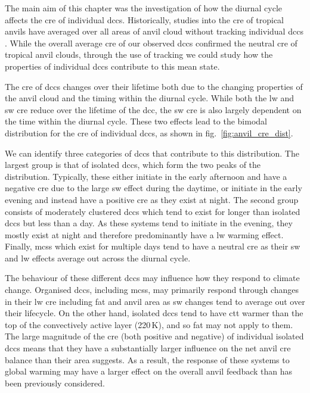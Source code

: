 The main aim of this chapter was the investigation of how the diurnal cycle affects the \acrshort{cre} of individual \acrshort{dcc}s.
Historically, studies into the \acrshort{cre} of tropical anvils have averaged over all areas of anvil cloud without tracking individual \acrshort{dcc}s \citep{ramanathan_cloud-radiative_1989, hartmann_effect_1992, stephens_cloudsat_2018}.
While the overall average \acrshort{cre} of our observed \acrshort{dcc}s confirmed the neutral \acrshort{cre} of tropical anvil clouds, through the use of tracking we could study how the properties of individual \acrshort{dcc}s contribute to this mean state.

The \acrshort{cre} of \acrshort{dcc}s changes over their lifetime both due to the changing properties of the anvil cloud and the timing within the diurnal cycle.
While both the \acrshort{lw} and \acrshort{sw} \acrshort{cre} reduce over the lifetime of the \acrshort{dcc}, the \acrshort{sw} \acrshort{cre} is also largely dependent on the time within the diurnal cycle.
These two effects lead to the bimodal distribution for the \acrshort{cre} of individual \acrshort{dcc}s, as shown in fig.~\ref{fig:anvil_cre_dist}.

We can identify three categories of \acrshort{dcc}s that contribute to this distribution.
The largest group is that of isolated \acrshort{dcc}s, which form the two peaks of the distribution.
Typically, these either initiate in the early afternoon and have a negative \acrshort{cre} due to the large \acrshort{sw} effect during the daytime, or initiate in the early evening and instead have a positive \acrshort{cre} as they exist at night.
The second group consists of moderately clustered \acrshort{dcc}s which tend to exist for longer than isolated \acrshort{dcc}s but less than a day.
As these systems tend to initiate in the evening, they mostly exist at night and therefore predominantly have a \acrshort{lw} warming effect.
Finally, \acrshort{mcs}s which exist for multiple days tend to have a neutral \acrshort{cre} as their \acrshort{sw} and \acrshort{lw} effects average out across the diurnal cycle.

The behaviour of these different \acrshort{dcc}s may influence how they respond to climate change.
Organised \acrshort{dcc}s, including \acrshort{mcs}s, may primarily respond through changes in their \acrshort{lw} \acrshort{cre} including \acrshort{fat} and anvil area as \acrshort{sw} changes tend to average out over their lifecycle.
On the other hand, isolated \acrshort{dcc}s tend to have \acrshort{ctt} warmer than the top of the convectively active layer (220\,\unit{K}), and so \acrshort{fat} may not apply to them.
The large magnitude of the \acrshort{cre} (both positive and negative) of individual isolated \acrshort{dcc}s means that they have a substantially larger influence on the net anvil \acrshort{cre} balance than their area suggests.
As a result, the response of these systems to global warming may have a larger effect on the overall anvil feedback than has been previously considered.


